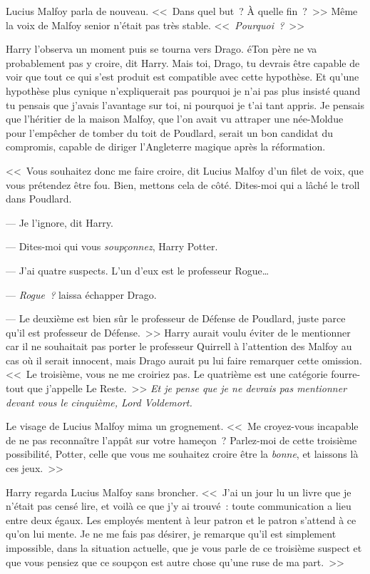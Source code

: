 Lucius Malfoy parla de nouveau. <<~Dans quel but~? À quelle fin~?~>> Même la voix de Malfoy senior n'était pas très stable. <<~\emph{Pourquoi~?}~>>

Harry l'observa un moment puis se tourna vers Drago. éTon père ne va probablement pas y croire, dit Harry. Mais toi, Drago, tu devrais être capable de voir que tout ce qui s'est produit est compatible avec cette hypothèse. Et qu'une hypothèse plus cynique n'expliquerait pas pourquoi je n'ai pas plus insisté quand tu pensais que j'avais l'avantage sur toi, ni pourquoi je t'ai tant appris. Je pensais que l'héritier de la maison Malfoy, que l'on avait vu attraper une née-Moldue pour l'empêcher de tomber du toit de Poudlard, serait un bon candidat du compromis, capable de diriger l'Angleterre magique après la réformation.

<<~Vous souhaitez donc me faire croire, dit Lucius Malfoy d'un filet de voix, que vous prétendez être fou. Bien, mettons cela de côté. Dites-moi qui a lâché le troll dans Poudlard.

--- Je l'ignore, dit Harry.

--- Dites-moi qui vous \emph{soupçonnez}, Harry Potter.

--- J'ai quatre suspects. L'un d'eux est le professeur Rogue…

--- \emph{Rogue~?} laissa échapper Drago.

--- Le deuxième est bien sûr le professeur de Défense de Poudlard, juste parce qu'il est professeur de Défense.~>> Harry aurait voulu éviter de le mentionner car il ne souhaitait pas porter le professeur Quirrell à l'attention des Malfoy au cas où il serait innocent, mais Drago aurait pu lui faire remarquer cette omission. <<~Le troisième, vous ne me croiriez pas. Le quatrième est une catégorie fourre-tout que j'appelle Le Reste.~>> \emph{Et je pense que je ne devrais pas mentionner devant vous le cinquième, Lord Voldemort.}

Le visage de Lucius Malfoy mima un grognement. <<~Me croyez-vous incapable de ne pas reconnaître l'appât sur votre hameçon~? Parlez-moi de cette troisième possibilité, Potter, celle que vous me souhaitez croire être la \emph{bonne}, et laissons là ces jeux.~>>

Harry regarda Lucius Malfoy sans broncher. <<~J'ai un jour lu un livre que je n'était pas censé lire, et voilà ce que j'y ai trouvé~: toute communication a lieu entre deux égaux. Les employés mentent à leur patron et le patron s'attend à ce qu'on lui mente. Je ne me fais pas désirer, je remarque qu'il est simplement impossible, dans la situation actuelle, que je vous parle de ce troisième suspect et que vous pensiez que ce soupçon est autre chose qu'une ruse de ma part.~>>

